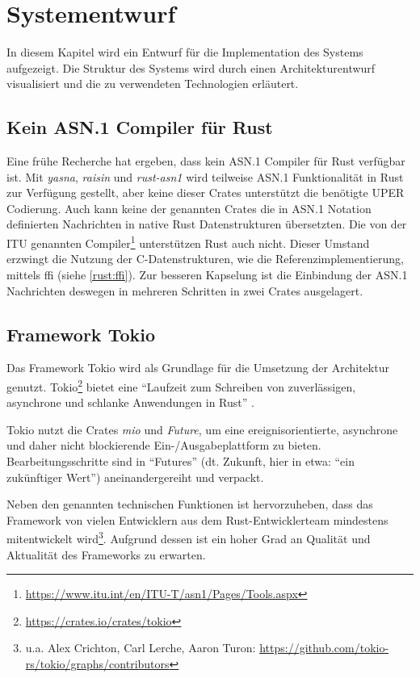 
\chapter{Systementwurf}
\label{design}

In diesem Kapitel wird ein Entwurf für die Implementation des Systems aufgezeigt.
Die Struktur des Systems wird durch einen Architekturentwurf visualisiert und die zu verwendeten Technologien erläutert.

\section{Kein ASN.1 Compiler für Rust}
\label{draft:no_asn_compiler}

Eine frühe Recherche hat ergeben, dass kein ASN.1 Compiler für Rust verfügbar ist.
Mit \textit{yasna}, \textit{raisin} und \textit{rust-asn1} wird teilweise ASN.1 Funktionalität in Rust zur Verfügung gestellt, aber keine dieser Crates unterstützt die benötigte UPER Codierung.
Auch kann keine der genannten Crates die in ASN.1 Notation definierten Nachrichten in native Rust Datenstrukturen übersetzten.
Die von der ITU genannten Compiler\footnote{\url{https://www.itu.int/en/ITU-T/asn1/Pages/Tools.aspx}} unterstützen Rust auch nicht.
Dieser Umstand erzwingt die Nutzung der C-Datenstrukturen, wie die Referenzimplementierung, mittels \gls{ffi} (siehe \autoref{rust:ffi}).
Zur besseren Kapselung ist die Einbindung der ASN.1 Nachrichten deswegen in mehreren Schritten in zwei Crates ausgelagert.

\section{Framework Tokio}
\label{design:tokio}

Das Framework Tokio wird als Grundlage für die Umsetzung der Architektur genutzt.
Tokio\footnote{\url{https://crates.io/crates/tokio}} bietet eine \enquote{Laufzeit zum Schreiben von zuverlässigen, asynchrone und schlanke Anwendungen in Rust} \cite{rust:crate:tokio}.

Tokio nutzt die Crates \textit{mio} und \textit{Future}, um eine ereignisorientierte, asynchrone und daher nicht blockierende Ein-/Ausgabeplattform zu bieten.
Bearbeitungsschritte sind in \enquote{Futures} (dt. Zukunft, hier in etwa: \enquote{ein zukünftiger Wert}) aneinandergereiht und verpackt.

Neben den genannten technischen Funktionen ist hervorzuheben, dass das Framework von vielen Entwicklern aus dem Rust-Entwicklerteam mindestens mitentwickelt wird\footnote{u.a. Alex Crichton, Carl Lerche, Aaron Turon: \url{https://github.com/tokio-rs/tokio/graphs/contributors}}.
Aufgrund dessen ist ein hoher Grad an Qualität und Aktualität des Frameworks zu erwarten.

